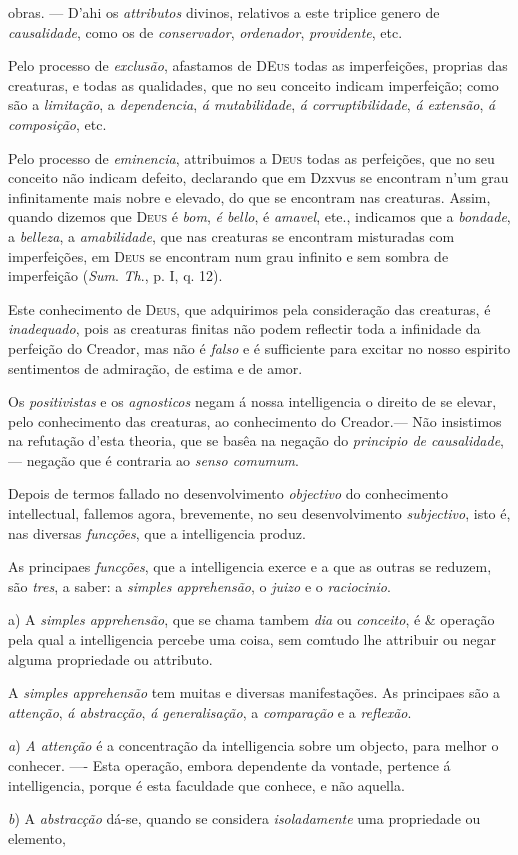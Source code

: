 obras. --- D'ahi os \emph{attributos} divinos, relativos a este triplice genero de \emph{causalidade}, como os de \emph{conservador}, \emph{ordenador}, \emph{providente}, etc.\par Pelo processo de \emph{exclusão}, afastamos de \textsc{DEus} todas as imperfeições, proprias das creaturas, e todas as qualidades, que no seu conceito indicam imperfeição; como são a \emph{limitação}, a \emph{dependencia}, \emph{á mutabilidade}, \emph{á corruptibilidade}, \emph{á extensão}, \emph{á composição}, etc.\par Pelo processo de \emph{eminencia}, attribuimos a \textsc{Deus} todas as perfeições, que no seu conceito não indicam defeito, declarando que em Dzxvus se encontram n'um grau infinitamente mais nobre e elevado, do que se encontram nas creaturas. Assim, quando dizemos que \textsc{Deus} é \emph{bom}, \emph{é bello}, é \emph{amavel}, ete., indicamos que a \emph{bondade}, a \emph{belleza}, a \emph{amabilidade}, que nas creaturas se encontram misturadas com imperfeições, em \textsc{Deus} se encontram num grau infinito e sem sombra de imperfeição (\emph{Sum}. \emph{Th}., p. I, q. 12).\par Este conhecimento de \textsc{Deus}, que adquirimos pela consideração das creaturas, é \emph{inadequado}, pois as creaturas finitas não podem reflectir toda a infinidade da perfeição do Creador, mas não é \emph{falso} e é sufficiente para excitar no nosso espirito sentimentos de admiração, de estima e de amor.\par Os \emph{positivistas} e os \emph{agnosticos} negam á nossa intelligencia o direito de se elevar, pelo conhecimento das creaturas, ao conhecimento do Creador.--- Não insistimos na refutação d'esta theoria, que se basêa na negação do \emph{principio de causalidade}, --- negação que é contraria ao \emph{senso comumum}.\par Depois de termos fallado no desenvolvimento \emph{objectivo} do conhecimento intellectual, fallemos agora, brevemente, no seu desenvolvimento \emph{subjectivo}, isto é, nas diversas \emph{funcções}, que a intelligencia produz.\par As principaes \emph{funcções}, que a intelligencia exerce e a que as outras se reduzem, são \emph{tres}, a saber: a \emph{simples apprehensão}, o \emph{juizo} e o \emph{raciocinio}.\par a) A \emph{simples apprehensão}, que se chama tambem \emph{dia} ou \emph{conceito}, é \& operação pela qual a intelligencia percebe uma coisa, sem comtudo lhe attribuir ou negar alguma propriedade ou attributo.\par A \emph{simples apprehensão} tem muitas e diversas manifestações. As principaes são a \emph{attenção}, \emph{á abstracção}, \emph{á generalisação}, a \emph{comparação} e a \emph{reflexão}.\par \emph{a}) \emph{A attenção} é a concentração da intelligencia sobre um objecto, para melhor o conhecer. ---- Esta operação, embora dependente da vontade, pertence á intelligencia, porque é esta faculdade que conhece, e não aquella.\par \emph{b}) A \emph{abstracção} dá-se, quando se considera \emph{isoladamente} uma propriedade ou elemento, 